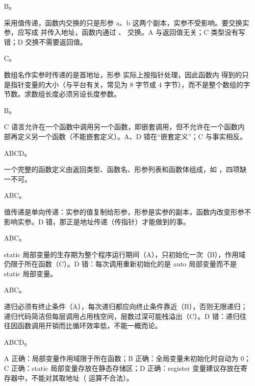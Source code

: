 \documentclass[a4paper,11pt]{article}
\begin{document}
\q B。\begin{analysis} 采用值传递，函数内交换的只是形参 a、b 这两个副本，实参不受影响。要交换实参，应写成  并传入地址，函数内通过 、 交换。A 与返回值无关；C 类型没有写错；D 交换不需要返回值。\end{analysis}

\q C。\begin{analysis}数组名作实参时传递的是首地址，形参  实际上按指针处理，因此函数内  得到的只是指针变量的大小（与平台有关，常见为 8 字节或 4 字节），而不是整个数组的字节数。求数组长度必须另设长度参数。\end{analysis}

\q B。\begin{analysis}C 语言允许在一个函数中调用另一个函数，即嵌套调用，但不允许在一个函数内部再定义另一个函数（不能嵌套定义）。A、D 错在“嵌套定义”；C 与事实相反。\end{analysis}


\q ABCD。\begin{analysis}一个完整的函数定义由返回类型、函数名、形参列表和函数体组成，如 ，四项缺一不可。\end{analysis}

\q ABC。\begin{analysis}值传递是单向传递：实参的值复制给形参，形参是实参的副本，函数内改变形参不影响实参。D 错，那正是地址传递（传指针）才能做到的事。\end{analysis}

\q ABC。\begin{analysis}static 局部变量的生存期为整个程序运行期间（A），只初始化一次（B），作用域仍限于所在函数（C）。D 错：每次调用重新初始化的是 auto 局部变量而不是 static 局部变量。\end{analysis}

\q ABC。\begin{analysis}递归必须有终止条件（A），每次递归都应向终止条件靠近（B），否则无限递归；递归代码简洁但每层调用占用栈空间，层数过深可能栈溢出（C）。D 错：递归往往因函数调用开销而比循环效率低，不能一概而论。\end{analysis}

\q ABCD。\begin{analysis}A 正确：局部变量作用域限于所在函数；B 正确：全局变量未初始化时自动为 0；C 正确：static 局部变量存放在静态存储区；D 正确：register 变量建议存放在寄存器中，不能对其取地址（\code{\&} 运算不合法）。\end{analysis}
\end{document}
